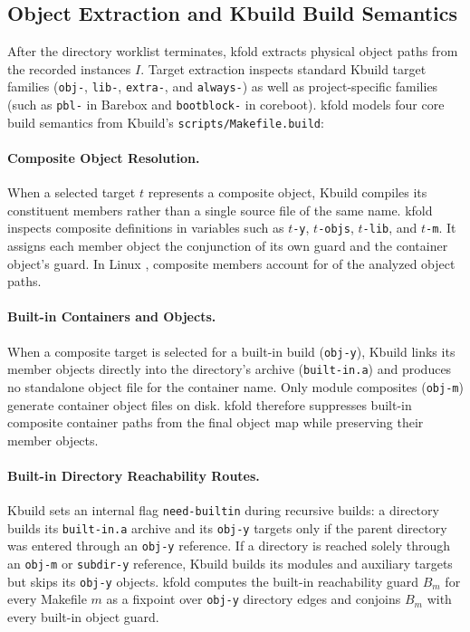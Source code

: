 \documentclass[acmsmall]{acmart}
\newcommand{\tool}{\textsf{kfold}\xspace}
\begin{document}
\subsection{Object Extraction and Kbuild Build Semantics}\label{sec:technique:build}

After the directory worklist terminates, \tool extracts physical object paths from the recorded instances $I$.
Target extraction inspects standard Kbuild target families (\texttt{obj-}, \texttt{lib-}, \texttt{extra-}, and \texttt{always-}) as well as project-specific families (such as \texttt{pbl-} in Barebox and \texttt{bootblock-} in coreboot).
\tool models four core build semantics from Kbuild's \texttt{scripts/Makefile.build}:

\paragraph{Composite Object Resolution.}
When a selected target $t$ represents a composite object, Kbuild compiles its constituent members rather than a single source file of the same name.
\tool inspects composite definitions in variables such as \texttt{$t$-y}, \texttt{$t$-objs}, \texttt{$t$-lib}, and \texttt{$t$-m}.
It assigns each member object the conjunction of its own guard and the container object's guard.
In Linux \NLinuxVersion, composite members account for \NLinuxMembers of the \NLinuxObjects analyzed object paths.

\paragraph{Built-in Containers and Objects.}
When a composite target is selected for a built-in build (\texttt{obj-y}), Kbuild links its member objects directly into the directory's archive (\texttt{built-in.a}) and produces no standalone object file for the container name.
Only module composites (\texttt{obj-m}) generate container object files on disk.
\tool therefore suppresses built-in composite container paths from the final object map while preserving their member objects.

\paragraph{Built-in Directory Reachability Routes.}
Kbuild sets an internal flag \texttt{need-builtin} during recursive builds: a directory builds its \texttt{built-in.a} archive and its \texttt{obj-y} targets only if the parent directory was entered through an \texttt{obj-y} reference.
If a directory is reached solely through an \texttt{obj-m} or \texttt{subdir-y} reference, Kbuild builds its modules and auxiliary targets but skips its \texttt{obj-y} objects.
\tool computes the built-in reachability guard $B_m$ for every Makefile $m$ as a fixpoint over \texttt{obj-y} directory edges and conjoins $B_m$ with every built-in object guard.
\end{document}
